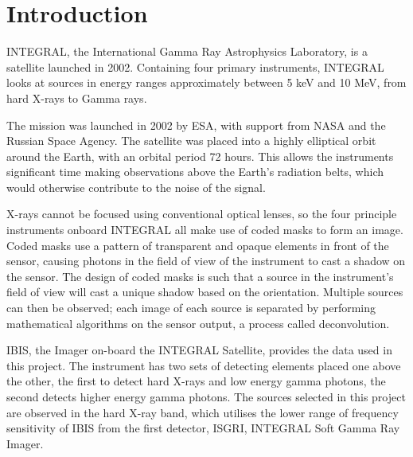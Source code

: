 
\chapter{Introduction} %

\label{ch:introduction} %


INTEGRAL, the International Gamma Ray Astrophysics Laboratory, is a satellite launched in 2002. Containing four primary instruments, INTEGRAL looks at sources in energy ranges approximately between 5 keV and 10 MeV, from hard X-rays to Gamma rays.

The mission was launched in 2002 by ESA, with support from NASA and the Russian Space Agency. The satellite was placed into a highly elliptical orbit around the Earth, with an orbital period 72 hours. This allows the instruments significant time making observations above the Earth's radiation belts, which would otherwise contribute to the noise of the signal.

X-rays cannot be focused using conventional optical lenses, so the four principle instruments onboard INTEGRAL all make use of coded masks to form an image. Coded masks use a pattern of transparent and opaque elements in front of the sensor, causing photons in the field of view of the instrument to cast a shadow on the sensor. The design of coded masks is such that a source in the instrument's field of view will cast a unique shadow based on the orientation. Multiple sources can then be observed; each image of each source is separated by performing mathematical algorithms on the sensor output, a process called deconvolution. 

IBIS, the Imager on-board the INTEGRAL Satellite, provides the data used in this project. The instrument has two sets of detecting elements placed one above the other, the first to detect hard X-rays and low energy gamma photons, the second detects higher energy gamma photons. The sources selected in this project are observed in the hard X-ray band, which utilises the lower range of frequency sensitivity of IBIS from the first detector, ISGRI, INTEGRAL Soft Gamma Ray Imager.

